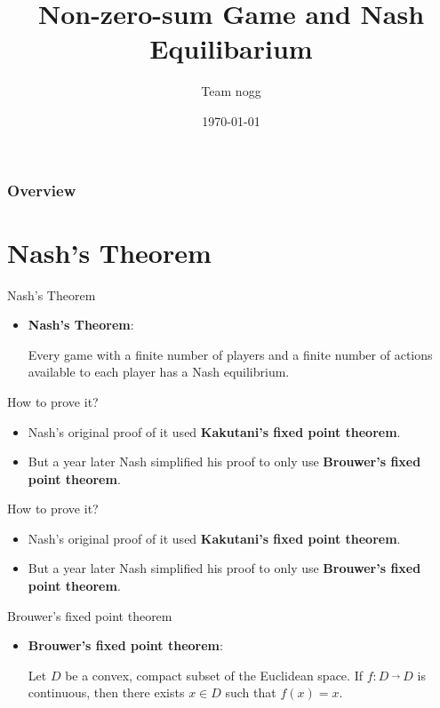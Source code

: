 \documentclass{beamer}
\title[Short title]{Non-zero-sum Game and Nash Equilibarium}
\author{Team nogg}
\institute[SJTU]
{

}
\date{\today}
\begin{document}
\begin{frame}
\titlepage
\end{frame}

\begin{frame}
\frametitle{Overview}
\tableofcontents
\end{frame}


\section{Nash’s Theorem}
\begin{frame}{Nash's Theorem}
	\begin{itemize}[]
		\item \textbf{\large Nash's Theorem}:
		
		\qquad Every game with a finite number of players and a finite number of actions
		available to each player has a Nash equilibrium.
	\end{itemize}
\end{frame}

\begin{frame}[fragile]{How to prove it?}
\begin{itemize}[<+->]
	\item Nash's original proof of it used \textbf{Kakutani's fixed point theorem}.
	\item But a year later Nash simplified his proof to only use \textbf{Brouwer’s fixed point theorem}.
\end{itemize}
\end{frame}

\begin{frame}[fragile]{How to prove it?}
	\begin{itemize}
		\item Nash's original proof of it used \textbf{Kakutani's fixed point theorem}.
		\item But a year later Nash simplified his proof to only use \textbf{\color{red}\large Brouwer’s fixed point theorem}.
	\end{itemize}
\end{frame}

\begin{frame}[fragile]{Brouwer’s fixed point theorem}
	\begin{itemize}
		\item \textbf{\large Brouwer’s fixed point theorem}:
		
		\qquad Let $D$ be a convex, compact subset of the Euclidean space. If $f : D\  \overrightarrow{}\ D$ is
		continuous, then there exists $x \in D$ such that $f (x) = x$.
	\end{itemize}
\end{frame}
\end{document}
